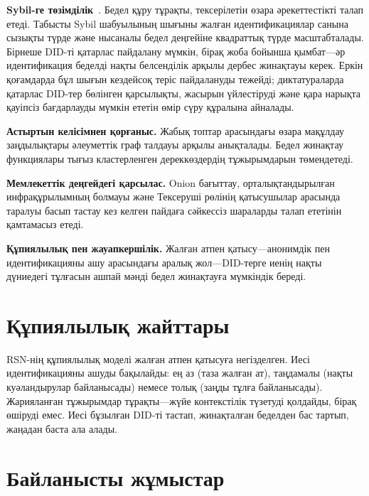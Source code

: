 \documentclass[11pt,a4paper,twocolumn]{article}
\begin{document}
\textbf{Sybil-ге төзімділік}~\cite{douceur2002}. Бедел құру тұрақты, тексерілетін өзара әрекеттестікті талап етеді. Табысты Sybil шабуылының шығыны жалған идентификациялар санына сызықты түрде және нысаналы бедел деңгейіне квадраттық түрде масштабталады. Бірнеше DID-ті қатарлас пайдалану мүмкін, бірақ жоба бойынша қымбат---әр идентификация беделді нақты белсенділік арқылы дербес жинақтауы керек. Еркін қоғамдарда бұл шығын кездейсоқ теріс пайдалануды тежейді; диктатураларда қатарлас DID-тер бөлінген қарсылықты, жасырын үйлестіруді және қара нарықта қауіпсіз бағдарлауды мүмкін ететін өмір сүру құралына айналады.

\textbf{Астыртын келісімнен қорғаныс.} Жабық топтар арасындағы өзара мақұлдау заңдылықтары әлеуметтік граф талдауы арқылы анықталады. Бедел жинақтау функциялары тығыз кластерленген дереккөздердің тұжырымдарын төмендетеді.

\textbf{Мемлекеттік деңгейдегі қарсылас.} Onion бағыттау, орталықтандырылған инфрақұрылымның болмауы және Тексеруші рөлінің қатысушылар арасында таралуы басып тастау кез келген пайдаға сәйкессіз шараларды талап ететінін қамтамасыз етеді.

\textbf{Құпиялылық пен жауапкершілік.} Жалған атпен қатысу---анонимдік пен идентификацияны ашу арасындағы аралық жол---DID-терге иенің нақты дүниедегі тұлғасын ашпай мәнді бедел жинақтауға мүмкіндік береді.

\section{Құпиялылық жайттары}

RSN-нің құпиялылық моделі жалған атпен қатысуға негізделген. Иесі идентификацияны ашуды бақылайды: ең аз (таза жалған ат), таңдамалы (нақты куәландырулар байланысады) немесе толық (заңды тұлға байланысады). Жарияланған тұжырымдар тұрақты---жүйе контекстілік түзетуді қолдайды, бірақ өшіруді емес. Иесі бұзылған DID-ті тастап, жинақталған беделден бас тартып, жаңадан баста ала алады.

\section{Байланысты жұмыстар}
\end{document}
